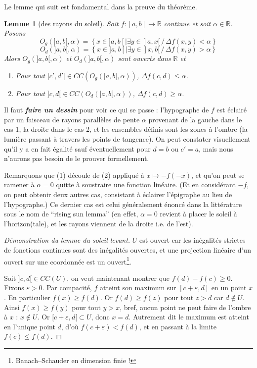\documentclass[a4paper, 11pt]{article}
\def\R{\mathbb{R}}
\newtheorem*{lemma}{Lemme}
\begin{document}
Le lemme qui suit est fondamental dans la preuve du théorème.

\begin{lemma}[des rayons du soleil]
  Soit $f : [a,b] \to \R$ continue et soit $\alpha \in \R$. Posons
  \[ O_g(]a,b[,\alpha)  = \left\{ x \in ]a,b[ | \exists y \in ]a,x[\,/\,
      \Delta f(x,y) < \alpha \right\} \]
  \[ O_d(]a,b[,\alpha) = \left\{ x \in ]a,b[ | \exists y \in ]x,b[\,/\,
      \Delta f(x,y) > \alpha \right\}
  \]
  Alors $O_g(]a,b[,\alpha)$ et $O_d(]a,b[,\alpha)$ sont ouverts dans $\R$ et
  \begin{enumerate}
  \item Pour tout $]c',d'[ \in CC(O_g(]a,b[,\alpha))$,
    $\displaystyle \Delta f(c,d) \leq \alpha$.
  \item Pour tout $]c,d[ \in CC(O_d(]a,b[,\alpha))$,
    $\displaystyle \Delta f(c,d) \geq \alpha$.
  \end{enumerate}
\end{lemma}
Il faut \textit{\textbf{faire un dessin}} pour voir ce qui se passe :
l'hypographe de $f$ est éclairé par un faisceau de rayons parallèles de pente
$\alpha$ provenant de la gauche dans le cas 1, la droite dans le cas 2, et les
ensembles définis sont les zones à l'ombre (la lumière passant à travers les
points de tangence). On peut constater visuellement qu'il y a en fait égalité
sauf éventuellement pour $d = b$ ou $c' = a$, mais nous n'aurons pas besoin de
le prouver formellement.

Remarquons que (1) découle de (2) appliqué à $x \mapsto -f(-x)$, et qu'on peut
se ramener à $\alpha = 0$ quitte à soustraire une fonction linéaire. (Et en
considérant $-f$, on peut obtenir deux autres cas, consistant à éclairer
l'épigraphe au lieu de l'hypographe.) Ce dernier cas est celui généralement
énoncé dans la littérature sous le nom de \enquote{rising sun lemma} (en effet,
$\alpha = 0$ revient à placer le soleil à l'horizon(tale), et les rayons
viennent de la droite i.e. de l'est).

\begin{proof}[Démonstration du lemme du soleil levant]
  $U$ est ouvert car les inégalités strictes de fonctions continues sont des
  inégalités ouvertes, et une projection linéaire d'un ouvert sur une coordonnée
  est un ouvert\footnote{Banach--Schauder en dimension finie !}.

  Soit $]c,d[ \in CC(U)$, on veut maintenant montrer que $f(d) - f(c) \geq 0$.
  Fixons $\varepsilon > 0$. Par compacité, $f$ atteint son maximum sur
  $[c+\varepsilon, d]$ en un point $x$. En particulier $f(x) \geq f(d)$. Or
  $f(d) \geq f(z)$ pour tout $z > d$ car $d \not\in U$. Ainsi $f(x) \geq f(y)$
  pour tout $y > x$, bref, aucun point ne peut faire de l'ombre à $x$ : $x
  \not\in U$. Or $[c+\varepsilon,d[ \subset U$, donc $x = d$. Autrement dit le
  maximum est atteint en l'unique point $d$, d'où $f(c+\varepsilon) < f(d)$, et
  en passant à la limite $f(c) \leq f(d)$.
\end{proof}
\end{document}
